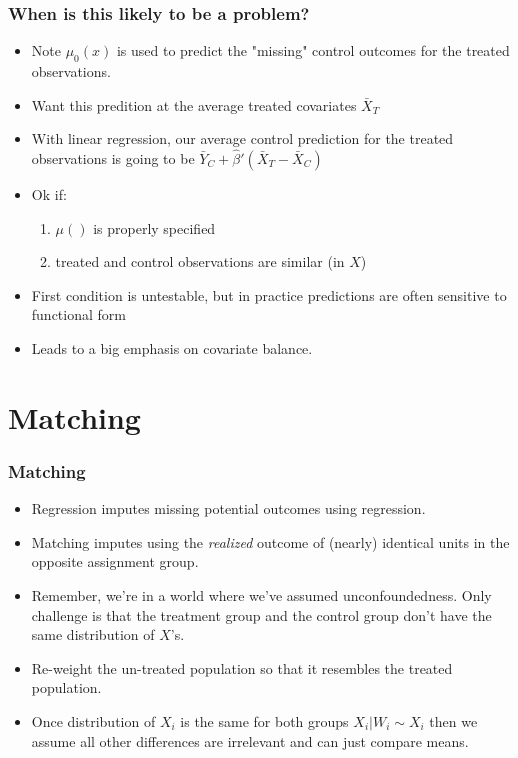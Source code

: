 \begin{frame}
  \frametitle{When is this likely to be a problem?}
  \begin{itemize}
    \item Note $\mu_0(x)$ is used to predict the "missing" control outcomes for the treated observations.
    \item Want this predition at the average treated covariates $\bar X_T$
    \item With linear regression, our average control prediction for the treated observations is going to be $\bar Y_C + \hat \beta'(\bar X_T - \bar X_C)$ 
    \item Ok if: 
    \begin{enumerate}
      \item $\mu()$ is properly specified
      \item treated and control observations are similar (in $X$)
    \end{enumerate}
    \item First condition is untestable, but in practice predictions are often sensitive to functional form
    \item Leads to a big emphasis on covariate balance. 
  \end{itemize} 
\end{frame}

\section{Matching}

\begin{frame}
\frametitle{Matching}
\begin{itemize}
\item Regression imputes missing potential outcomes using regression. 
\item Matching imputes using the \textit{realized} outcome of (nearly) identical units in the opposite assignment group. 
\item Remember, we're in a world where we've assumed unconfoundedness. Only challenge is that the treatment group and the control group don't have the same distribution of $X$'s. 
\item \alert{Re-weight} the un-treated population so that it resembles the treated population.
\item Once distribution of $X_i$ is the same for both groups $ X_i | W_i \sim X_i$ then we assume all other differences are irrelevant and can just compare means.
\end{itemize}
\end{frame}

